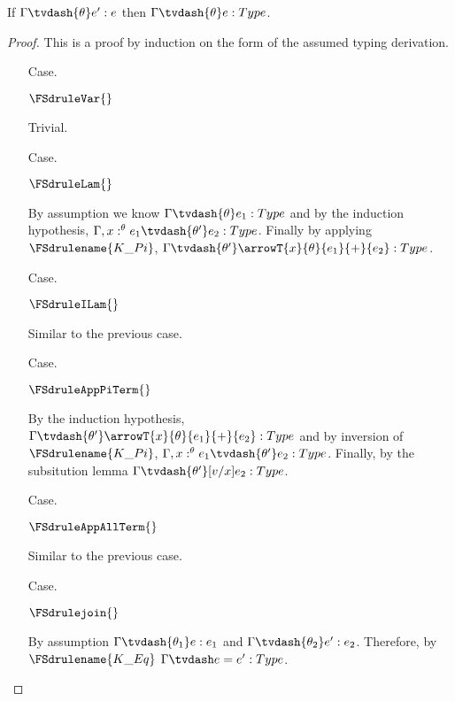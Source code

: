 \begin{lemma}[Regularity]
  \label{lemma:regularity}
  If $\Gamma \tvdash{\theta} e':e$ then $\Gamma \tvdash{\theta} e:Type$.
\end{lemma}
\begin{proof}
  This is a proof by induction on the form of the assumed typing derivation.
  
  \begin{itemize}
  \item[Case.] \ \\
    \begin{center}
      $\FSdruleVar{}$
    \end{center}
    Trivial.

  \item[Case.] \ \\
    \begin{center}
      $\FSdruleLam{}$
    \end{center}
    By assumption we know $\Gamma \tvdash{\theta} e_1:Type$ and by the induction hypothesis,
    $\Gamma,x:^\theta e_1 \tvdash{\theta'} e_2:Type$. Finally by applying 
    $\FSdrulename{K\_Pi}$, $\Gamma \tvdash{\theta'} \arrowT{x}{\theta}{e_1}{+}{e_2}:Type$.

  \item[Case.] \ \\
    \begin{center}
      $\FSdruleILam{}$
    \end{center}
    Similar to the previous case.

  \item[Case.] \ \\
    \begin{center}
      $\FSdruleAppPiTerm{}$
    \end{center}
    By the induction hypothesis, $\Gamma \tvdash{\theta'} \arrowT{x}{\theta}{e_1}{+}{e_2}:Type$
    and by inversion of $\FSdrulename{K\_Pi}$, $\Gamma, x:^\theta e_1 \tvdash{\theta'} e_2:Type$.
    Finally, by the subsitution lemma $\Gamma \tvdash{\theta'} [v/x]e_2:Type$.

  \item[Case.] \ \\
    \begin{center}
      $\FSdruleAppAllTerm{}$ 
    \end{center}
    Similar to the previous case.

  \item[Case.] \ \\
    \begin{center}
      $\FSdrulejoin{}$
    \end{center}
    By assumption $\Gamma \tvdash{\theta_1} e:e_1$ and $\Gamma \tvdash{\theta_2} e':e_2$.  
    Therefore, by $\FSdrulename{K\_Eq}$ $\Gamma \tvdash e = e':Type$.


\end{itemize}
\end{proof}
